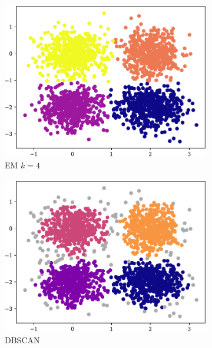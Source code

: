 
\begin{figure}[t!]
    \begin{subfigure}[b]{0.45\textwidth}
            \includegraphics[width=\textwidth]{../plots/4-4_pred_em.pdf}
            \caption{EM $k = 4$}
            \label{subfig:4-4-em}
    \end{subfigure}
    \hspace{0.09\textwidth}
    \begin{subfigure}[b]{0.45\textwidth}
        \includegraphics[width=\textwidth]{../plots/4-4_pred_dbscan.pdf}
        \caption{DBSCAN}
        \label{subfig:4-4-dbscan}
    \end{subfigure}
    \begin{subfigure}[b]{0.45\textwidth}

\end{subfigure}
\end{figure}
